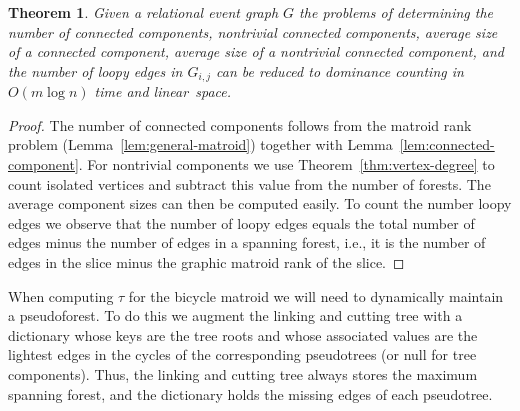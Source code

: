 \documentclass[11pt]{article}
\newtheorem{theorem}{Theorem}
\begin{document}
\begin{theorem}\label{thm:connected-component}
Given a relational event graph $G$ the problems of determining the number of connected components, nontrivial connected components, average size of a connected component,  average size of a nontrivial connected component, and the number of loopy edges in $G_{i,j}$ can be reduced to dominance counting in $O(m\log n)$ time and linear~space.
\end{theorem}

\begin{proof}
The number of connected components follows from the matroid rank problem (Lemma~\ref{lem:general-matroid}) together with Lemma~\ref{lem:connected-component}. For nontrivial components we use Theorem~\ref{thm:vertex-degree} to count isolated vertices and subtract this value from the number of forests. The average component sizes can then be computed easily. To count the number loopy edges we observe that the number of loopy edges equals the total number of edges minus the number of edges in a spanning forest, i.e., it is the number of edges in the slice minus the graphic matroid rank of the slice.
\end{proof}

When computing $\tau$ for the bicycle matroid we will need to dynamically maintain a pseudoforest. To do this we augment the linking and cutting tree with a dictionary whose keys are the tree roots and whose associated values are the lightest edges in the cycles of the corresponding pseudotrees (or null for tree components). Thus, the linking and cutting tree always stores the maximum spanning forest, and the dictionary holds the missing edges of each pseudotree.
\end{document}
